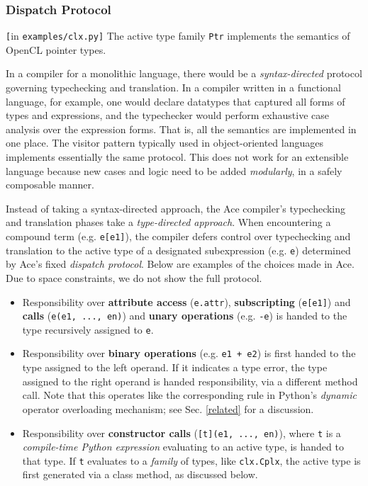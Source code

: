 \documentclass[9pt,preprint]{sigplanconf}
\begin{document}
\subsubsection{Dispatch Protocol}
\begin{codelisting}

\caption{\texttt{[}in \texttt{examples/clx.py]} The active type family \texttt{Ptr} implements the semantics of OpenCL pointer types.}
\label{cplx}
\end{codelisting}
In a compiler for a monolithic language, there would be a \emph{syntax-directed} protocol governing typechecking and translation. In a compiler written in a functional language, for example, one would declare datatypes that captured all forms of types and expressions, and the typechecker would perform exhaustive case analysis over the expression forms. That is, all the semantics are implemented in one place. The visitor pattern typically used in object-oriented languages implements essentially the same protocol. This does not work for an extensible language because new cases and logic need to be added \emph{modularly}, in a safely composable manner.

Instead of taking a syntax-directed approach, the Ace compiler's typechecking and translation phases take a \emph{type-directed approach}. When encountering a compound term (e.g. \verb|e[e1]|), the compiler defers control over typechecking and translation to the active type of a designated subexpression (e.g. \verb|e|) determined by Ace's fixed \emph{dispatch protocol}. Below are examples of the choices made in Ace. Due to space constraints, we do not show the full protocol.
\begin{itemize}
\item Responsibility over {\bf attribute access} (\texttt{e.attr}), {\bf subscripting} (\texttt{e[e1]}) and \textbf{calls} (\verb|e(e1, ..., en)|) and {\bf unary operations} (e.g. \verb|-e|) is handed to the type recursively assigned to \texttt{e}.
\item Responsibility over {\bf binary operations} (e.g. \verb|e1 + e2|) is first handed to the type assigned to the left operand. If it indicates a type error, the type assigned to the right operand is handed responsibility, via a different method call. {Note that this operates like the corresponding rule in Python's \emph{dynamic} operator overloading mechanism; see Sec. \ref{related} for a discussion.}
\item Responsibility over \textbf{constructor calls} (\verb|[t](e1, ..., en)|), where \verb|t| is a \emph{compile-time Python expression} evaluating to an active type, is handed to that type. If \verb|t| evaluates to a \emph{family} of types, like \verb|clx.Cplx|, the active type is first generated via a class method, as discussed below.
\end{itemize}
\end{document}
